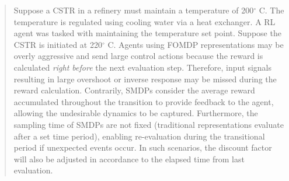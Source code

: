 \begin{quote}
Suppose a CSTR in a refinery must maintain a temperature of 200$^{\circ}$ C.  The temperature is regulated using cooling water via a heat exchanger.  A RL agent was tasked with maintaining the temperature set point. Suppose the CSTR is initiated at 220$^{\circ}$ C.  Agents using FOMDP representations may be overly aggressive and send large control actions because the reward is calculated \textit{right before} the next evaluation step. Therefore, input signals resulting in large overshoot or inverse response may be missed during the reward calculation. Contrarily, SMDPs consider the average reward accumulated throughout the transition to provide feedback to the agent, allowing the undesirable dynamics to be captured. Furthermore, the sampling time of SMDPs are not fixed (traditional representations evaluate after a set time period), enabling re-evaluation during the transitional period if unexpected events occur. In such scenarios, the discount factor will also be adjusted in accordance to the elapsed time from last evaluation.
\end{quote}









